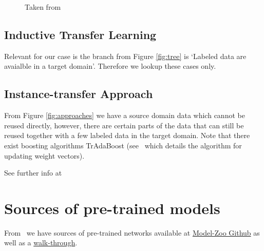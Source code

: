 \documentclass[11pt]{article}
\begin{document}
\begin{figure}[H]


    \caption{Taken from~\cite{survey-on-transfer-learning}}
\end{figure}    

\subsection{Inductive Transfer Learning}

Relevant for our case is the branch from Figure \ref{fig:tree} is `Labeled data are avaialble in a target domain'. Therefore we lookup these cases only.

\subsection{Instance-transfer Approach}

From Figure \ref{fig:approaches} we have a source domain data which cannot be reused directly, however, there are certain parts of the data that can still be reused together with a few labeled data in the target domain. Note that there exist boosting algorithms TrAdaBoost (see~\cite{transfer-learning-boosting} which details the algorithm for updating weight vectors).

\vspace{1em}

See further info at~\cite{survey-on-transfer-learning}

\section{Sources of pre-trained models}

From~\cite{gentle-introduction-to-transfer-learning} we have sources of pre-trained networks available at \href{https://github.com/BVLC/caffe/wiki/Model-Zoo}{Model-Zoo Github} as well as a \href{https://machinelearningmastery.com/how-to-use-transfer-learning-when-developing-convolutional-neural-network-models/}{walk-through}.

\printbibliography
\end{document}
